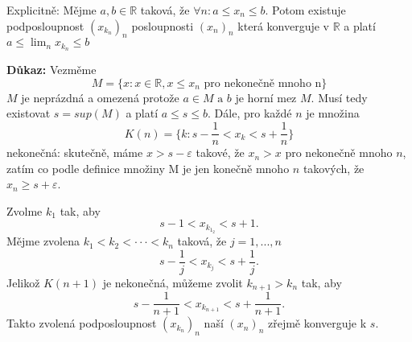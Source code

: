 \documentclass[../main.tex]{subfiles}
\begin{document}
\noindent
\hspace{1.2mm}
Explicitně:
Mějme $a,b \in \mathbb{R}$ taková, že $\forall n: a \leq x_n \leq b$. Potom existuje podposloupnost
$(x_{k_n})_n$ posloupnosti $(x_n)_n$ která konverguje v $\mathbb{R}$ a platí
$a \leq \lim_n x_{k_n} \leq b$

\vspace{5mm}
\noindent
\textbf{Důkaz:} 
Vezměme \[M = \{x : x \in \mathbb{R}, x \leq x_n \text{ pro nekonečně mnoho n}\}\]
$M$ je neprázdná a omezená protože $a \in M \text{ a } b$ je horní mez $M$. Musí tedy existovat $s = sup(M)$ a platí 
$a \leq s \leq b$. Dále, pro každé $n$ je množina 
\[K(n) = \{k : s - \frac{1}{n} < x_k < s + \frac{1}{n}\}\]
nekonečná: skutečně, máme $x > s - \varepsilon$ takové, že $x_n > x$ pro nekonečně mnoho $n$, zatím co podle definice množiny M je jen
konečně mnoho $n$ takových, že $x_n \geq s + \varepsilon$. 

Zvolme $k_1$ tak, aby
\[s - 1 < x_{k_{1_2}} < s+1.\]
Mějme zvolena $k_1 < k_2 < \cdot \cdot \cdot < k_n$ taková, že $j = 1,...,n$
\[s - \frac{1}{j} < x_{k_j} < s + \frac{1}{j}.\]
Jelikož $K(n+1)$ je nekonečná, můžeme zvolit $k_{n+1} > k_n$ tak, aby
\[s - \frac{1}{n+1} < x_{k_{n+1}} < s + \frac{1}{n+1}.\]
Takto zvolená podposloupnost $(x_{k_n})_n$ naší $(x_n)_n$ zřejmě konverguje k $s$.
\end{document}
